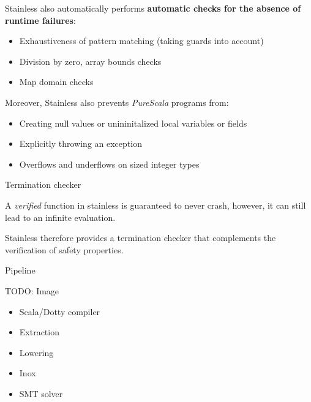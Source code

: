 \documentclass[
  ignorenonframetext,
]{beamer}
\providecommand{\tightlist}{%
  \setlength{\itemsep}{0pt}\setlength{\parskip}{0pt}}
\begin{document}
\begin{frame}

Stainless also automatically performs \textbf{automatic checks for the
absence of runtime failures}:

\begin{itemize}
\tightlist
\item
  Exhaustiveness of pattern matching (taking guards into account)
\item
  Division by zero, array bounds checks
\item
  Map domain checks
\end{itemize}

\end{frame}

\begin{frame}

Moreover, Stainless also prevents \emph{PureScala} programs from:

\begin{itemize}
\tightlist
\item
  Creating null values or unininitalized local variables or fields
\item
  Explicitly throwing an exception
\item
  Overflows and underflows on sized integer types
\end{itemize}

\end{frame}

\begin{frame}{Termination checker}
\protect\hypertarget{termination-checker}{}

A \emph{verified} function in stainless is guaranteed to never crash,
however, it can still lead to an infinite evaluation.

Stainless therefore provides a termination checker that complements the
verification of safety properties.

\end{frame}

\begin{frame}{Pipeline}
\protect\hypertarget{pipeline}{}

TODO: Image

\begin{itemize}
\tightlist
\item
  Scala/Dotty compiler
\item
  Extraction
\item
  Lowering
\item
  Inox
\item
  SMT solver
\end{itemize}

\end{frame}
\end{document}
